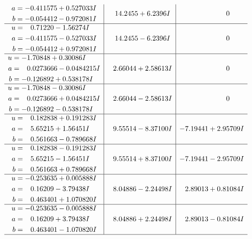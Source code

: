 \documentclass[1p]{elsarticle_modified}
\theoremstyle{definition}
\begin{document}
$$\begin{array}{c|c|c}
\begin{aligned}
a &= -0.411575 + 0.527033 I \\
b &= -0.054412 - 0.972081 I\end{aligned}
 & \phantom{-}14.2455 + 6.2396 I & \phantom{-0.000000 } 0 \\ \hline\begin{aligned}
u &= \phantom{-}0.71220 - 1.56274 I \\
a &= -0.411575 - 0.527033 I \\
b &= -0.054412 + 0.972081 I\end{aligned}
 & \phantom{-}14.2455 - 6.2396 I & \phantom{-0.000000 } 0 \\ \hline\begin{aligned}
u &= -1.70848 + 0.30086 I \\
a &= \phantom{-}0.0273666 - 0.0484215 I \\
b &= -0.126892 + 0.538178 I\end{aligned}
 & \phantom{-}2.66044 + 2.58613 I & \phantom{-0.000000 } 0 \\ \hline\begin{aligned}
u &= -1.70848 - 0.30086 I \\
a &= \phantom{-}0.0273666 + 0.0484215 I \\
b &= -0.126892 - 0.538178 I\end{aligned}
 & \phantom{-}2.66044 - 2.58613 I & \phantom{-0.000000 } 0 \\ \hline\begin{aligned}
u &= \phantom{-}0.182838 + 0.191283 I \\
a &= \phantom{-}5.65215 + 1.56451 I \\
b &= \phantom{-}0.561663 - 0.789668 I\end{aligned}
 & \phantom{-}9.55514 - 8.37100 I & -7.19441 + 2.95709 I \\ \hline\begin{aligned}
u &= \phantom{-}0.182838 - 0.191283 I \\
a &= \phantom{-}5.65215 - 1.56451 I \\
b &= \phantom{-}0.561663 + 0.789668 I\end{aligned}
 & \phantom{-}9.55514 + 8.37100 I & -7.19441 - 2.95709 I \\ \hline\begin{aligned}
u &= -0.253635 + 0.005888 I \\
a &= \phantom{-}0.16209 - 3.79438 I \\
b &= \phantom{-}0.463401 + 1.070820 I\end{aligned}
 & \phantom{-}8.04886 - 2.24498 I & \phantom{-}2.89013 + 0.81084 I \\ \hline\begin{aligned}
u &= -0.253635 - 0.005888 I \\
a &= \phantom{-}0.16209 + 3.79438 I \\
b &= \phantom{-}0.463401 - 1.070820 I\end{aligned}
 & \phantom{-}8.04886 + 2.24498 I & \phantom{-}2.89013 - 0.81084 I\\
 \hline 
 \end{array}$$\newpage\newpage\renewcommand{\arraystretch}{1}
\end{document}
